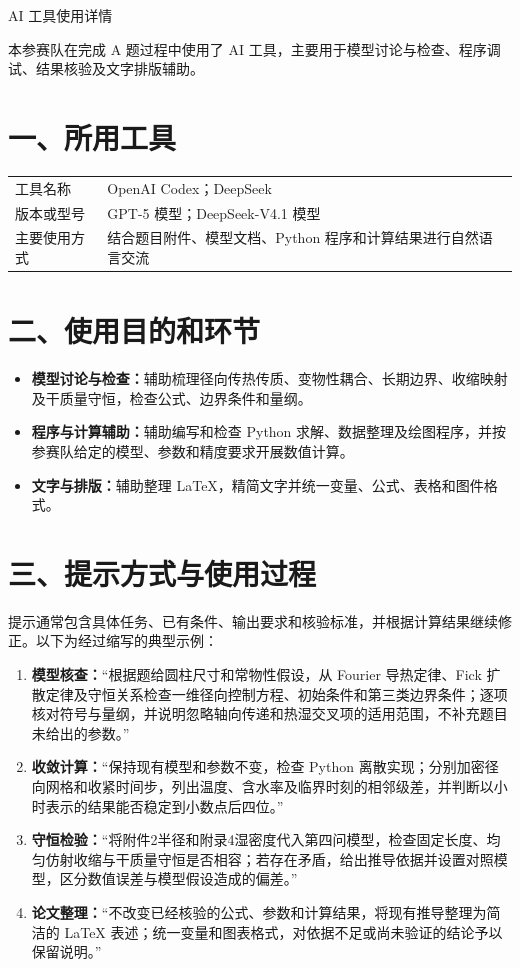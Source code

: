 \documentclass[UTF8,11pt,fontset=fandol]{ctexart}
\begin{document}
\begin{center}
  {\heiti{} AI 工具使用详情}
\end{center}

本参赛队在完成 A 题过程中使用了 AI 工具，主要用于模型讨论与检查、程序调试、结果核验及文字排版辅助。

\section*{一、所用工具}

\noindent\begin{tabularx}{\linewidth}{@{}p{2.7cm}X@{}}
\toprule
工具名称 & OpenAI Codex；DeepSeek \\
版本或型号 & GPT-5 模型；DeepSeek-V4.1 模型 \\
主要使用方式 & 结合题目附件、模型文档、Python 程序和计算结果进行自然语言交流 \\
\bottomrule
\end{tabularx}

\section*{二、使用目的和环节}

\begin{itemize}
  \item \textbf{模型讨论与检查：}辅助梳理径向传热传质、变物性耦合、长期边界、收缩映射及干质量守恒，检查公式、边界条件和量纲。
  \item \textbf{程序与计算辅助：}辅助编写和检查 Python 求解、数据整理及绘图程序，并按参赛队给定的模型、参数和精度要求开展数值计算。
  \item \textbf{文字与排版：}辅助整理 LaTeX，精简文字并统一变量、公式、表格和图件格式。
\end{itemize}

\section*{三、提示方式与使用过程}

提示通常包含具体任务、已有条件、输出要求和核验标准，并根据计算结果继续修正。以下为经过缩写的典型示例：

\begin{enumerate}
  \item \textbf{模型核查：}“根据题给圆柱尺寸和常物性假设，从 Fourier 导热定律、Fick 扩散定律及守恒关系检查一维径向控制方程、初始条件和第三类边界条件；逐项核对符号与量纲，并说明忽略轴向传递和热湿交叉项的适用范围，不补充题目未给出的参数。”
  \item \textbf{收敛计算：}“保持现有模型和参数不变，检查 Python 离散实现；分别加密径向网格和收紧时间步，列出温度、含水率及临界时刻的相邻级差，并判断以小时表示的结果能否稳定到小数点后四位。”
  \item \textbf{守恒检验：}“将附件2半径和附录4湿密度代入第四问模型，检查固定长度、均匀仿射收缩与干质量守恒是否相容；若存在矛盾，给出推导依据并设置对照模型，区分数值误差与模型假设造成的偏差。”
  \item \textbf{论文整理：}“不改变已经核验的公式、参数和计算结果，将现有推导整理为简洁的 LaTeX 表述；统一变量和图表格式，对依据不足或尚未验证的结论予以保留说明。”
\end{enumerate}
\end{document}
